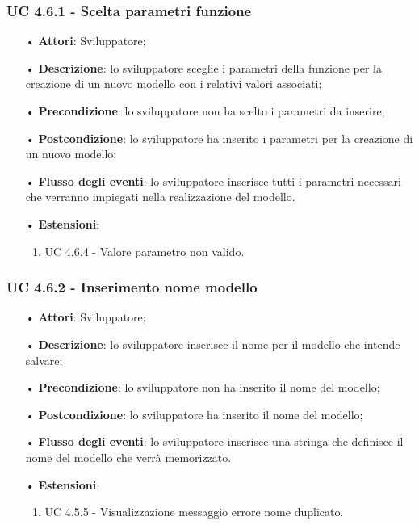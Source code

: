 \subsubsection{UC 4.6.1 - Scelta parametri funzione}
\begin{itemize}
	\item[•]\textbf{Attori}: Sviluppatore;
	\item[•]\textbf{Descrizione}: lo sviluppatore sceglie i parametri della funzione per la creazione di un nuovo modello con i relativi valori associati;
	\item[•]\textbf{Precondizione}: lo sviluppatore non ha scelto i parametri da inserire;
	\item[•]\textbf{Postcondizione}: lo sviluppatore ha inserito i parametri per la creazione di un nuovo modello;
	\item[•]\textbf{Flusso degli eventi}:  lo sviluppatore inserisce tutti i parametri necessari che verranno impiegati nella realizzazione del modello.
	\item[•] \textbf{Estensioni}: 
	\begin{enumerate}
		\item UC 4.6.4 - Valore parametro non valido.
	\end{enumerate}
\end{itemize}

\subsubsection{UC 4.6.2 - Inserimento nome modello}
\begin{itemize}
	\item[•]\textbf{Attori}: Sviluppatore;
	\item[•]\textbf{Descrizione}: lo sviluppatore inserisce il nome per il modello che intende salvare;
	\item[•]\textbf{Precondizione}: lo sviluppatore non ha inserito il nome del modello;
	\item[•]\textbf{Postcondizione}: lo sviluppatore ha inserito il nome del modello;
	\item[•]\textbf{Flusso degli eventi}: lo sviluppatore inserisce una stringa che definisce il nome del modello che verrà memorizzato.
	\item[•] \textbf{Estensioni}: 
	\begin{enumerate}
		\item UC 4.5.5 - Visualizzazione messaggio errore nome duplicato.
	\end{enumerate}
\end{itemize}

